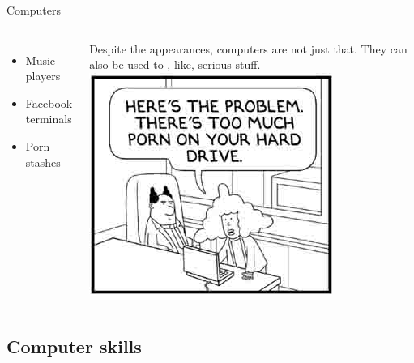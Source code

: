 \documentclass{beamer}
\begin{document}
	\begin{frame}[t]{Computers}
	
		\begin{columns}[T]
			
			\begin{itemize}
				\item Music players
				\item Facebook terminals
				\item Porn stashes
			\end{itemize}

			Despite the appearances, computers are not just that.\vspace{1em}			
			They can also be used to , like, serious stuff.
			\includegraphics[width=\textwidth]{images/dilbert-porn.jpg}
		\end{columns}
	
	\end{frame}		

	\subsection{Computer skills}
\end{document}
